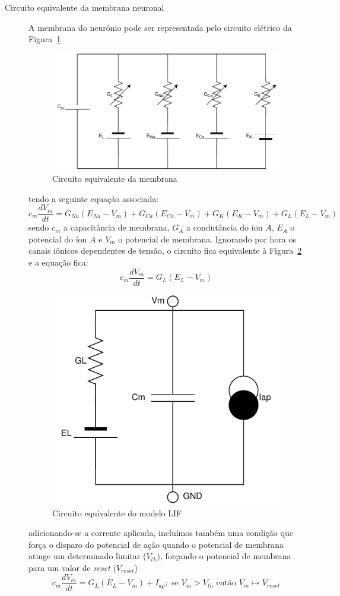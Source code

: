 \begin{description}
	\item[Circuito equivalente da membrana neuronal] A membrana do neurônio pode ser representada pelo circuito elétrico da Figura~\ref{fig:circuitomembrana}
	
	\begin{figure}[htb!]
		\centering
		\caption{Circuito equivalente da membrana}
		\label{fig:circuitomembrana}
		\includegraphics[width=0.7\linewidth]{figs/circuito_membrana}
	\end{figure}
	
	tendo a seguinte equação associada:
	$$
	c_m\frac{dV_m}{dt} = G_{Na}(E_{Na}-V_m) + G_{Ca}(E_{Ca}-V_m) + G_K(E_K-V_m) + G_L(E_L-V_m)
	$$
	sendo $c_m$ a capacitância de membrana, $G_A$ a condutância do íon $A$, $E_A$ o potencial do íon $A$ e $V_m$ o potencial de membrana. Ignorando por hora os canais iônicos dependentes de tensão, o circuito fica equivalente à Figura~\ref{fig:circuitolif} e a equação fica:
	$$
	c_m\frac{dV_m}{dt} = G_L(E_L-V_m)
	$$
	
	\begin{figure}[htb!]
		\centering
		\caption{Circuito equivalente do modelo LIF}
		\label{fig:circuitolif}
		\includegraphics[width=0.5\linewidth]{figs/circuito_lif}
	\end{figure}
	
	adicionando-se a corrente aplicada, incluímos também uma condição que força o disparo do potencial de ação quando o potencial de membrana atinge um determinado limitar ($V_{th}$), forçando o potencial de membrana para um valor de \textit{reset} ($V_{reset}$) \cite{miller_introductory_2018}
	$$
	c_m\frac{dV_m}{dt} = G_L(E_L-V_m)+I_{ap}; \text{ se } V_m > V_{th} \text{ então } V_m\mapsto V_{reset}
	$$
	

\end{description}

